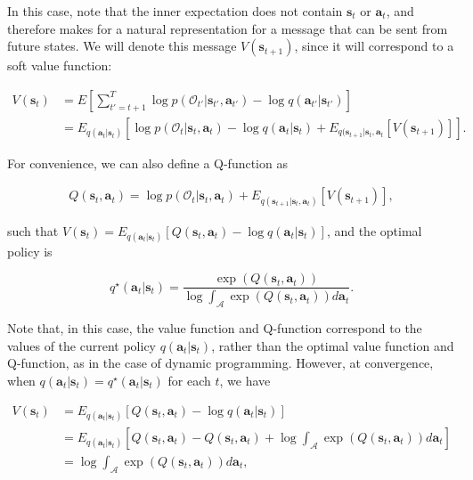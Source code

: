 In this case, note that the inner expectation does not contain $\mathbf{s}_t$ or $\mathbf{a}_t$, and therefore makes for a natural representation for a message that can be sent from future states. We will denote this message $V(\mathbf{s}_{t+1})$, since it will correspond to a soft value function:

\begin{align*}
V(\mathbf{s}_t) &= E \left[ \sum_{t'=t+1}^T \log p(\mathcal{O}_{t'} | \mathbf{s}_{t'},\mathbf{a}_{t'}) - \log q(\mathbf{a}_{t'}|\mathbf{s}_{t'}) \right] \\
&= E_{q(\mathbf{a}_t | \mathbf{s}_t)}[\log p(\mathcal{O}_t | \mathbf{s}_t,\mathbf{a}_t) - \log q(\mathbf{a}_t|\mathbf{s}_t) + E_{q(\mathbf{s}_{t+1}|\mathbf{s}_t,\mathbf{a}_t}[V(\mathbf{s}_{t+1})] ].
\end{align*}

For convenience, we can also define a Q-function as

\begin{align*}
Q(\mathbf{s}_t,\mathbf{a}_t) = \log p(\mathcal{O}_t | \mathbf{s}_t,\mathbf{a}_t) + E_{q(\mathbf{s}_{t+1}|\mathbf{s}_t,\mathbf{a}_t)}[V(\mathbf{s}_{t+1})],
\end{align*}

such that $V(\mathbf{s}_t) = E_{q(\mathbf{a}_t | \mathbf{s}_t)}[Q(\mathbf{s}_t,\mathbf{a}_t) - \log q(\mathbf{a}_t|\mathbf{s}_t)]$, and the optimal policy is

\begin{equation}
q^\star(\mathbf{a}_t|\mathbf{s}_t) = \frac{\exp(Q(\mathbf{s}_t,\mathbf{a}_t))}{\log \int_\mathcal{A} \exp(Q(\mathbf{s}_t,\mathbf{a}_t)) d\mathbf{a}_t }. \label{eq:optpolicy}
\end{equation}

Note that, in this case, the value function and Q-function correspond to the values of the current policy $q(\mathbf{a}_t|\mathbf{s}_t)$, rather than the optimal value function and Q-function, as in the case of dynamic programming. However, at convergence, when $q(\mathbf{a}_t|\mathbf{s}_t) = q^\star(\mathbf{a}_t|\mathbf{s}_t)$ for each $t$, we have

\begin{align}
V(\mathbf{s}_t) &= E_{q(\mathbf{a}_t | \mathbf{s}_t)}[Q(\mathbf{s}_t,\mathbf{a}_t) - \log q(\mathbf{a}_t | \mathbf{s}_t)] \nonumber \\
&= E_{q(\mathbf{a}_t | \mathbf{s}_t)}\left[ Q(\mathbf{s}_t,\mathbf{a}_t) - Q(\mathbf{s}_t,\mathbf{a}_t) + \log \int_\mathcal{A} \exp(Q(\mathbf{s}_t,\mathbf{a}_t)) d\mathbf{a}_t \right] \nonumber \\
&= \log \int_\mathcal{A} \exp(Q(\mathbf{s}_t,\mathbf{a}_t)) d\mathbf{a}_t, \label{eq:valuefunction}
\end{align}

